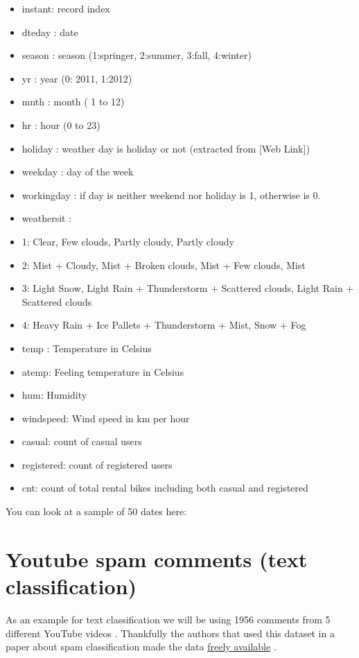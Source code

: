 \documentclass[12pt,]{krantz}
\providecommand{\tightlist}{%
  \setlength{\itemsep}{0pt}\setlength{\parskip}{0pt}}
\theoremstyle{definition}
\theoremstyle{definition}
\theoremstyle{definition}
\theoremstyle{remark}
\begin{document}
\begin{itemize}
\tightlist
\item
  instant: record index
\item
  dteday : date
\item
  season : season (1:springer, 2:summer, 3:fall, 4:winter)
\item
  yr : year (0: 2011, 1:2012)
\item
  mnth : month ( 1 to 12)
\item
  hr : hour (0 to 23)
\item
  holiday : weather day is holiday or not (extracted from {[}Web
  Link{]})
\item
  weekday : day of the week
\item
  workingday : if day is neither weekend nor holiday is 1, otherwise is
  0.
\item
  weathersit :
\item
  1: Clear, Few clouds, Partly cloudy, Partly cloudy
\item
  2: Mist + Cloudy, Mist + Broken clouds, Mist + Few clouds, Mist
\item
  3: Light Snow, Light Rain + Thunderstorm + Scattered clouds, Light
  Rain + Scattered clouds
\item
  4: Heavy Rain + Ice Pallets + Thunderstorm + Mist, Snow + Fog
\item
  temp : Temperature in Celsius
\item
  atemp: Feeling temperature in Celsius
\item
  hum: Humidity
\item
  windspeed: Wind speed in km per hour
\item
  casual: count of casual users
\item
  registered: count of registered users
\item
  cnt: count of total rental bikes including both casual and registered
\end{itemize}

You can look at a sample of 50 dates here:

\hypertarget{htmlwidget-555866c809bfad2b4283}{}

\section{Youtube spam comments (text classification)}\label{spam.data}

As an example for text classification we will be using 1956 comments
from 5 different YouTube videos . Thankfully the authors that used this
dataset in a paper about spam classification made the data
\href{http://dcomp.sor.ufscar.br/talmeida/youtubespamcollection/}{freely
available} \citep{alberto2015tubespam}.
\end{document}
